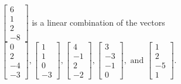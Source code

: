 \begin{exercise}
\begin{exerciseStatement}
  \end{exerciseStatement}
  \begin{exerciseAnswer}
   \(\left[\begin{array}{c}
6 \\
1 \\
2 \\
-8
\end{array}\right]\) 
  	 is  
	a linear combination of the vectors \(\left[\begin{array}{c}
0 \\
2 \\
-4 \\
-3
\end{array}\right] , \left[\begin{array}{c}
1 \\
1 \\
0 \\
-3
\end{array}\right] , \left[\begin{array}{c}
4 \\
-1 \\
2 \\
-2
\end{array}\right] , \left[\begin{array}{c}
3 \\
-3 \\
-1 \\
0
\end{array}\right] , \text{ and } \left[\begin{array}{c}
1 \\
2 \\
-5 \\
1
\end{array}\right]\).

	
  


  \end{exerciseAnswer}
\end{exercise}